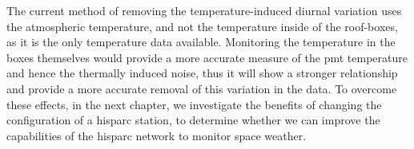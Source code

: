 The current method of removing the temperature-induced diurnal variation uses the atmospheric temperature, and not the temperature inside of the roof-boxes, as it is the only temperature data available. Monitoring the temperature in the boxes themselves would provide a more accurate measure of the \gls{pmt} temperature and hence the thermally induced noise, thus it will show a stronger relationship and provide a more accurate removal of this variation in the data. To overcome these effects, in the next chapter, we investigate the benefits of changing the configuration of a \gls{hisparc} station, to determine whether we can improve the capabilities of the \gls{hisparc} network to monitor space weather.